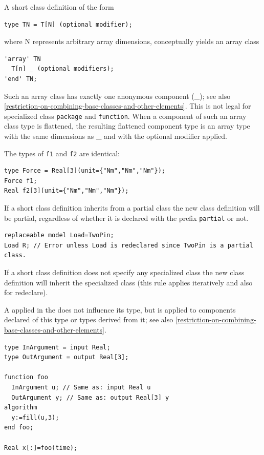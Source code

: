 A short class definition of the form
\begin{lstlisting}[language=modelica]
type TN = T[N] (optional modifier);
\end{lstlisting}
where N represents arbitrary array dimensions, conceptually yields an array class
\begin{lstlisting}[language=modelica]
'array' TN
  T[n] _ (optional modifiers);
'end' TN;
\end{lstlisting}

Such an array class has exactly one anonymous component (\_); see also \cref{restriction-on-combining-base-classes-and-other-elements}.
This is not legal for specialized class \lstinline!package! and \lstinline!function!.
When a component of such an array class type is flattened, the resulting flattened component type is an array type with the same dimensions as \_ and with the optional modifier applied.

\begin{example}
The types of \lstinline!f1! and \lstinline!f2! are identical:
\begin{lstlisting}[language=modelica]
type Force = Real[3](unit={"Nm","Nm","Nm"});
Force f1;
Real f2[3](unit={"Nm","Nm","Nm"});
\end{lstlisting}
\end{example}

If a short class definition inherits from a partial class the new class definition will be partial, regardless of whether it is declared with the prefix \lstinline!partial! or not.

\begin{example}
\begin{lstlisting}[language=modelica]
replaceable model Load=TwoPin;
Load R; // Error unless Load is redeclared since TwoPin is a partial class.
\end{lstlisting}
\end{example}

If a short class definition does not specify any specialized class the new class definition will inherit the specialized class (this rule applies iteratively and also for redeclare).

A  applied in the  does not influence its type, but is applied to components declared of this type or types derived from it; see also \cref{restriction-on-combining-base-classes-and-other-elements}.

\begin{example}
\begin{lstlisting}[language=modelica]
type InArgument = input Real;
type OutArgument = output Real[3];

function foo
  InArgument u; // Same as: input Real u
  OutArgument y; // Same as: output Real[3] y
algorithm
  y:=fill(u,3);
end foo;

Real x[:]=foo(time);
\end{lstlisting}
\end{example}

